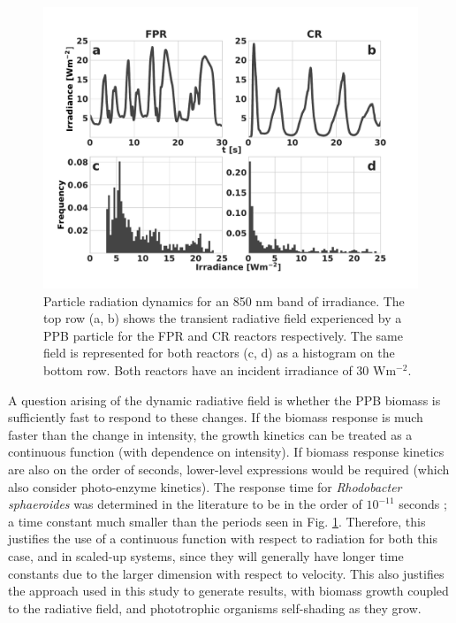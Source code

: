 \begin{figure}[tp]
\centering
\includegraphics[width=1.\linewidth]{Images/Chap3/G850_short.pdf}
\caption{Particle radiation dynamics for an 850 nm band of irradiance. The top row (a, b) shows the transient radiative field experienced by a PPB particle for the FPR and CR reactors respectively. The same field is represented for both reactors (c, d) as a histogram on the bottom row. Both reactors have an incident irradiance of 30 $\mathrm{ W m^{-2}}$.}
\label{fig:G850_short}
\end{figure}

A question arising of the dynamic radiative field is whether the PPB biomass is sufficiently fast to respond to these changes. If the biomass response is much faster than the change in intensity, the growth kinetics can be treated as a continuous function (with dependence on intensity). If biomass response kinetics are also on the order of seconds, lower-level expressions would be required (which also consider photo-enzyme kinetics). The response time for \textit{Rhodobacter sphaeroides} was determined in the literature to be in the order of $10^{-11}$ seconds \cite{Slouf2012}; a time constant much smaller than the periods seen in Fig. \ref{fig:G850_short}. Therefore, this justifies the use of a continuous function with respect to radiation for both this case, and in scaled-up systems, since they will generally have longer time constants due to the larger dimension with respect to velocity. This also justifies the approach used in this study to generate results, with biomass growth coupled to the radiative field, and phototrophic organisms self-shading as they grow.

